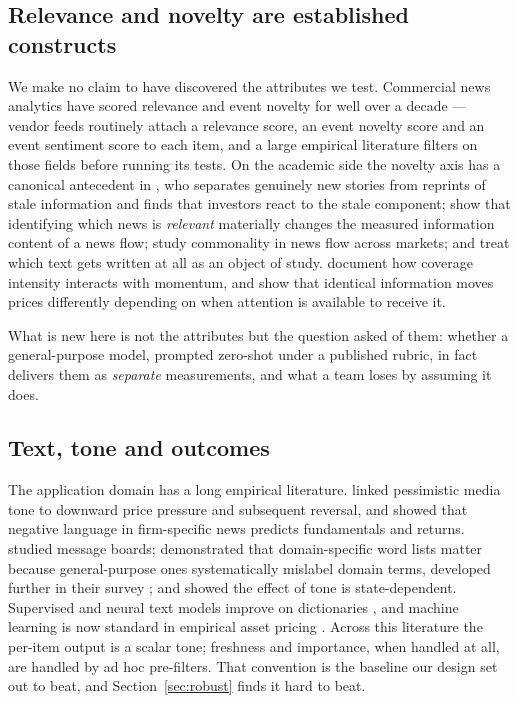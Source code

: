 \documentclass[preprint,12pt,authoryear]{elsarticle}
\theoremstyle{plain}
\theoremstyle{remark}
\begin{document}
\subsection{Relevance and novelty are established constructs}

We make no claim to have discovered the attributes we test. Commercial news
analytics have scored relevance and event novelty for well over a decade ---
vendor feeds routinely attach a relevance score, an event novelty score and an
event sentiment score to each item, and a large empirical literature filters on
those fields before running its tests. On the academic side the novelty axis has
a canonical antecedent in \citet{tetlock2011}, who separates genuinely new
stories from reprints of stale information and finds that investors react to the
stale component; \citet{boudoukh2019} show that identifying which news is
\emph{relevant} materially changes the measured information content of a news
flow; \citet{dang2015} study commonality in news flow across markets; and
\citet{kelly2021} treat which text gets written at all as an object of study.
\citet{hillert2014} document how coverage intensity interacts with momentum, and
\citet{dellavigna2009} show that identical information moves prices differently
depending on when attention is available to receive it.

What is new here is not the attributes but the question asked of them: whether a
general-purpose model, prompted zero-shot under a published rubric, in fact
delivers them as \emph{separate} measurements, and what a team loses by assuming
it does.

\subsection{Text, tone and outcomes}

The application domain has a long empirical literature. \citet{tetlock2007}
linked pessimistic media tone to downward price pressure and subsequent
reversal, and \citet{tetlock2008} showed that negative language in firm-specific
news predicts fundamentals and returns. \citet{antweiler2004} studied message
boards; \citet{loughran2011} demonstrated that domain-specific word lists matter
because general-purpose ones systematically mislabel domain terms, developed
further in their survey \citep{loughran2016}; and \citet{garcia2013} showed the
effect of tone is state-dependent. Supervised and neural text models improve on
dictionaries \citep{ke2019,huang2023}, and machine learning is now standard in
empirical asset pricing \citep{gu2020}. Across this literature the per-item
output is a scalar tone; freshness and importance, when handled at all, are
handled by ad hoc pre-filters. That convention is the baseline our design set
out to beat, and Section~\ref{sec:robust} finds it hard to beat.
\end{document}

